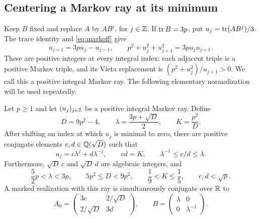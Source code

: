 \subsection{Centering a Markov ray at its minimum}

Keep $B$ fixed and replace $A$ by $AB^j$, for $j\in\mathbb{Z}$. If
$\operatorname{tr} B=3p$, put $u_j=\operatorname{tr}(AB^j)/3$. The trace identity and
\eqref{eq:markoff} give
\begin{equation}\label{eq:ray-recurrence}
 u_{j+1}=3pu_j-u_{j-1},\qquad
 p^2+u_j^2+u_{j+1}^2=3pu_ju_{j+1}.
\end{equation}
These are positive integers at every integral index: each adjacent
triple is a positive Markov triple, and its Vieta replacement is
$(p^2+u_j^2)/u_{j+1}>0$. We call this a positive integral Markov ray.
The following elementary normalization will be used repeatedly.

\begin{lemma}\label{lem:ray-model}
Let $p\geqslant1$ and let $(u_j)_{j\in\mathbb{Z}}$ be a positive integral
Markov ray. Define
\begin{equation}\label{eq:ray-parameters}
 D=9p^2-4,\qquad \lambda=\frac{3p+\sqrt D}{2},\qquad K=\frac{p^2}{D}.
\end{equation}
After shifting an index at which $u_j$ is minimal to zero, there are
positive conjugate elements $c,d\in\mathbb{Q}(\sqrt D)$ such that
\begin{equation}\label{eq:ray-spectral}
 u_j=c\lambda^j+d\lambda^{-j},\qquad cd=K,\qquad
 \lambda^{-1}\leqslant c/d\leqslant\lambda.
\end{equation}
Furthermore, $\sqrt D\,c$ and $\sqrt D\,d$ are algebraic integers, and
\begin{equation}\label{eq:ray-elementary-bounds}
 \frac52p<\lambda<3p,\qquad
 5p^2\leqslant D<9p^2,\qquad
 \frac19<K\leqslant\frac15,\qquad c,d<\sqrt p.
\end{equation}
A marked realization with this ray is simultaneously conjugate over
$\mathbb{R}$ to
\begin{equation}\label{eq:ray-positive-matrices}
 A_0=\begin{pmatrix}3c&2/\sqrt D\\2/\sqrt D&3d\end{pmatrix},\qquad
 B=\begin{pmatrix}\lambda&0\\0&\lambda^{-1}\end{pmatrix}.
\end{equation}
\end{lemma}


